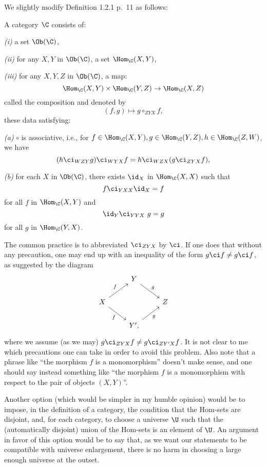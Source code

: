 \documentclass[12pt]{article}
\theoremstyle{remark}
\theoremstyle{definition}
\begin{document}
We slightly modify Definition 1.2.1 p.~11 as follows:
\begin{df}
A category $\C$ consists of:

\nn\emph{(i)} a set $\Ob(\C)$,

\nn\emph{(ii)} for any $X,Y$ in $\Ob(\C)$, a set $\Hom_\C(X,Y)$,

\nn\emph{(iii)} for any $X,Y,Z$ in $\Ob(\C)$, a map:
$$
\Hom_\C(X,Y)\times\Hom_\C(Y,Z)\to\Hom_\C(X, Z)
$$ 
called the composition and denoted by 
$$
(f,g)\mapsto g\circ_{ZYX} f,
$$ 
these data satisfying:

\nn\emph{(a)} $\circ$ is associative, i.e., for $f\in\Hom_\C(X,Y),g\in\Hom_\C(Y,Z),h\in\Hom_\C(Z,W)$, we have 
$$
(h\ci_{WZY}g)\ci_{WYX}f=h\ci_{WZX}(g\ci_{ZYX}f),
$$ 

\nn\emph{(b)} for each $X$ in $\Ob(\C)$, there exists $\id_X$ in $\Hom_\C(X,X)$ such that 
$$
f\ci_{YXX}\id_X=f
$$ 
for all $f$ in $\Hom_\C(X,Y)$ and 
$$
\id_Y\ci_{YYX}\ g=g
$$ 
for all $g$ in $\Hom_\C(Y,X)$.
\end{df}

The common practice is to abbreviated $\ci_{ZYX}$ by $\ci$. If one does that without any precaution, one may end up with an inequality of the form $g\ci f\ne g\ci f$, as suggested by the diagram 
$$
\begin{tikzcd}
&Y\ar[dr,"g"]\\
X\ar[ur,"f"]\ar[dr,"f"']&&Z\\ 
&Y',\ar[ur,"g"']
\end{tikzcd}
$$ 
where we assume (as we may) $g\ci_{ZYX}f\ne g\ci_{ZY'X}f$. %
It is not clear to me which precautions one can take in order to avoid this problem. Also note that a phrase like ``the morphism $f$ is a monomorphism'' doesn't make sense, and one should say instead something like ``the morphism $f$ is a monomorphism with respect to the pair of objects $(X,Y)$''. 

Another option (which would be simpler in my humble opinion) would be to impose, in the definition of a category, the condition that the Hom-sets are disjoint, and, for each category, to choose a universe $\U$ such that the (automatically disjoint) union of the Hom-sets is an element of $\U$. An argument in favor of this option would be to say that, as we want our statements to be compatible with universe enlargement, there is no harm in choosing a large enough universe at the outset.
\end{document}
